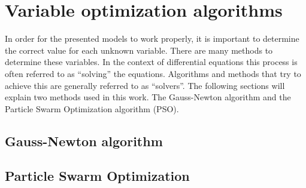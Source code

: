 
\section{Variable optimization algorithms}
In order for the presented models to work properly, it is important to determine the correct value for each unknown variable. There are many
methods to determine these variables. In the context of differential equations this process is often referred to as ``solving'' the equations.
Algorithms and methods that try to achieve this are generally referred to as ``solvers''.
The following sections will explain two methods used in this work. The Gauss-Newton algorithm and the Particle Swarm Optimization algorithm (PSO).


\subsection{Gauss-Newton algorithm}
\label{sec:Gauss}


\subsection{Particle Swarm Optimization}
\label{sec:PSO}



